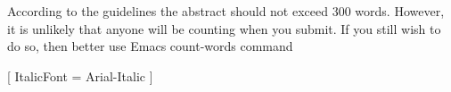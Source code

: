 According to the guidelines the abstract should not exceed 300 words. However, it is unlikely that anyone will be counting when you submit. If you still wish to do so, then better use
Emacs count-words command 



\usepackage{fontspec}
[
  ItalicFont = Arial-Italic  %
]
\newcommand{\malayitalic}[1]{{\arialitalic #1}}



\afterpreface  %